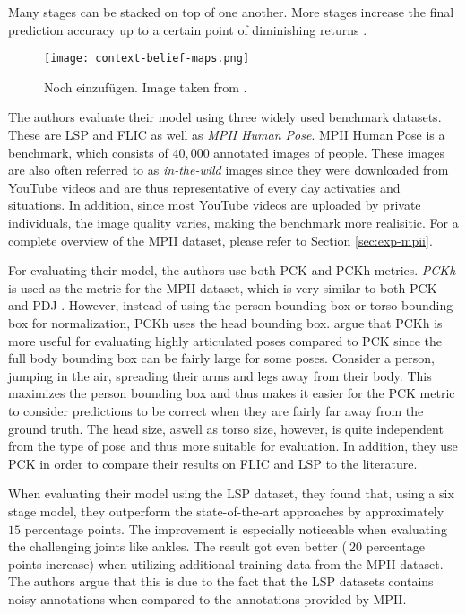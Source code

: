 Many stages can be stacked on top of one another.
More stages increase the final prediction accuracy up to a certain point of diminishing returns \cite{wei_convolutional_2016}. 



\begin{figure}[htb!]
    \centering
    \texttt{[image: context-belief-maps.png]}
    \caption{Noch einzufügen. Image taken from \cite{wei_convolutional_2016}.}
    \label{fig:context-belief-maps}
\end{figure}

\label{sec:pose-machine-evaluation}

The authors evaluate their model using three widely used benchmark datasets.
These are LSP and FLIC  as well as \textit{MPII Human Pose}.  
MPII Human Pose is a benchmark, which consists of $40,000$ annotated images of people.
These images are also often referred to as \textit{in-the-wild} images since they were downloaded from YouTube videos and are thus representative of every day activaties and situations.
In addition, since most YouTube videos are uploaded by private individuals, the image quality varies, making the benchmark more realisitic.
For a complete overview of the MPII dataset, please refer to Section \ref{sec:exp-mpii}.

For evaluating their model, the authors use both PCK  and PCKh metrics.
\textit{PCKh} is used as the metric for the MPII dataset, which is very similar to both PCK and PDJ .
However, instead of using the person bounding box or torso bounding box for normalization, PCKh uses the head bounding box.
\cite{andriluka_2d_2014} argue that PCKh is more useful for evaluating highly articulated poses compared to PCK since the full body bounding box can be fairly large for some poses.
Consider a person, jumping in the air, spreading their arms and legs away from their body.
This maximizes the person bounding box and thus makes it easier for the PCK metric to consider predictions to be correct when they are fairly far away from the ground truth.
The head size, aswell as torso size, however, is quite independent from the type of pose and thus more suitable for evaluation.
In addition, they use PCK in order to compare their results on FLIC and LSP to the literature.

When evaluating their model using the LSP dataset, they found that, using a six stage model, they outperform the state-of-the-art approaches by approximately $15$ percentage points.
The improvement is especially noticeable when evaluating the challenging joints like ankles.
The result got even better ($~20$ percentage points increase) when utilizing additional training data from the MPII dataset.
The authors argue that this is due to the fact that the LSP datasets contains noisy annotations when compared to the annotations provided by MPII.

